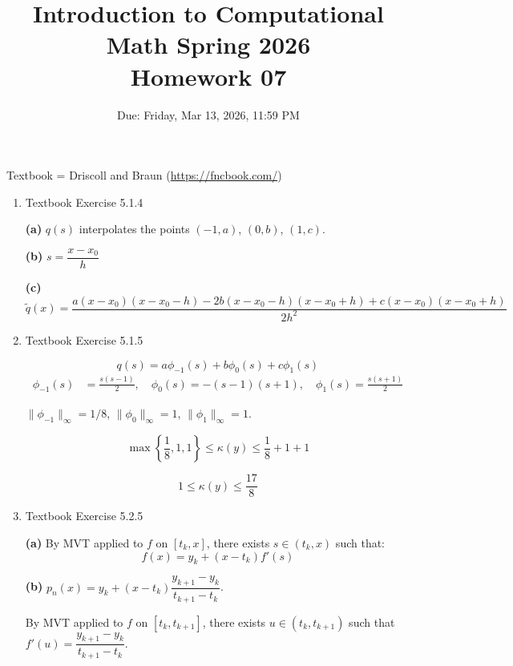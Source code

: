 \documentclass[reqno, answers]{exam}
\title{Introduction to Computational Math Spring 2026 \\ Homework 07}
\date{Due: Friday, Mar 13, 2026, 11:59 PM}
\author{}
\begin{document}
\maketitle
\thispagestyle{empty}

Textbook = Driscoll and Braun (\url{https://fncbook.com/})

\begin{enumerate}

    \item Textbook Exercise 5.1.4
          \begin{solution}
              \textbf{(a)} $q(s)$ interpolates the points $(-1,a)$, $(0,b)$, $(1,c)$.

              \textbf{(b)} $s = \dfrac{x - x_0}{h}$

              \textbf{(c)} $$\tilde{q}(x) = \frac{a(x-x_0)(x-x_0-h) - 2b(x-x_0-h)(x-x_0+h) + c(x-x_0)(x-x_0+h)}{2h^2}$$
          \end{solution}

    \item Textbook Exercise 5.1.5
          \begin{solution}
              $$q(s) = a\phi_{-1}(s) + b\phi_0(s) + c\phi_1(s)$$
              \begin{align*}
                  \phi_{-1}(s) & = \frac{s(s-1)}{2}, \quad \phi_0(s) = -(s-1)(s+1), \quad \phi_1(s) = \frac{s(s+1)}{2}
              \end{align*}

              $\|\phi_{-1}\|_\infty = 1/8$, \quad $\|\phi_0\|_\infty = 1$, \quad $\|\phi_1\|_\infty = 1$.

              $$\max\left\{\frac{1}{8}, 1, 1\right\} \leq \kappa(y) \leq \frac{1}{8} + 1 + 1$$

              $$1 \leq \kappa(y) \leq \frac{17}{8}$$
          \end{solution}

    \item Textbook Exercise 5.2.5

          \begin{solution}
              \textbf{(a)} By MVT applied to $f$ on $[t_k, x]$, there exists $s \in (t_k, x)$ such that:
              $$f(x) = y_k + (x - t_k)f'(s)$$

              \textbf{(b)} $p_n(x) = y_k + (x - t_k)\dfrac{y_{k+1} - y_k}{t_{k+1} - t_k}$.

              By MVT applied to $f$ on $[t_k, t_{k+1}]$, there exists $u \in (t_k, t_{k+1})$ such that $f'(u) = \dfrac{y_{k+1} - y_k}{t_{k+1} - t_k}$.


\end{solution}
\end{enumerate}
\end{document}
